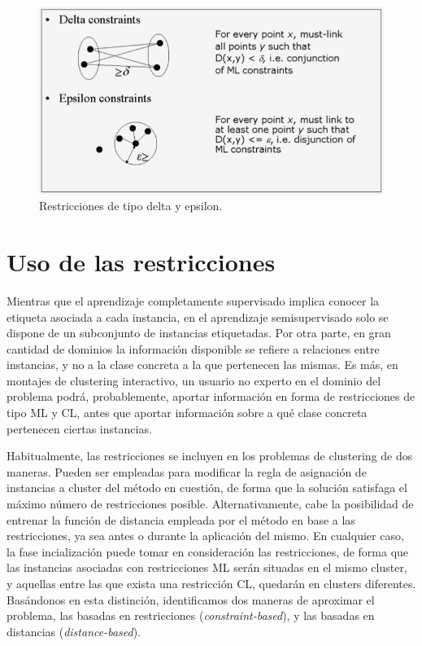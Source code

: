 \begin{figure}[!h]
	\centering
	\includegraphics[scale=0.45]{imagenes/c3/RestriccionesDeltaEpsilo.png} 
	\caption{Restricciones de tipo delta y epsilon. \cite{Survey:2007}}\label{fig:figure4}
\end{figure}

\clearpage

\section{Uso de las restricciones}

Mientras que el aprendizaje completamente supervisado implica conocer la etiqueta asociada a cada instancia, en el aprendizaje semisupervisado solo se dispone de un subconjunto de instancias etiquetadas. Por otra parte, en gran cantidad de dominios la información disponible se refiere a relaciones entre instancias, y no a la clase concreta a la que pertenecen las mismas. Es más, en montajes de clustering interactivo, un usuario no experto en el dominio del problema podrá, probablemente, aportar información en forma de restricciones de tipo \acf{ML} y \acf{CL}, antes que aportar información sobre a qué clase concreta pertenecen ciertas instancias.

Habitualmente, las restricciones se incluyen en los problemas de clustering de dos maneras. Pueden ser empleadas para modificar la regla de asignación de instancias a cluster del método en cuestión, de forma que la solución satisfaga el máximo número de restricciones posible. Alternativamente, cabe la posibilidad de entrenar la función de distancia empleada por el método en base a las restricciones, ya sea antes o durante la aplicación del mismo. En cualquier caso, la fase incialización puede tomar en consideración las restricciones, de forma que las instancias asociadas con restricciones \acf{ML} serán situadas en el mismo cluster, y aquellas entre las que exista una restricción \acf{CL}, quedarán en clusters diferentes. Basándonos en esta distinción, identificamos dos maneras de aproximar el problema, las basadas en restricciones (\textit{constraint-based}), y las basadas en distancias (\textit{distance-based}).

